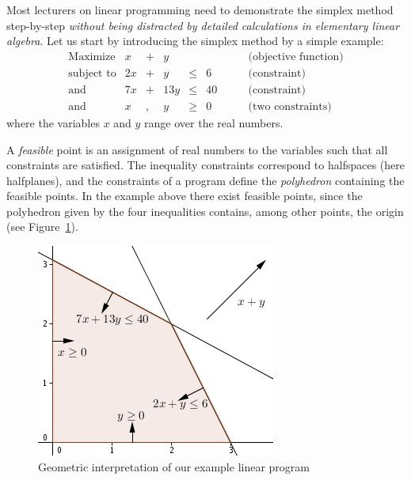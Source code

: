 \documentclass[ukenglish]{nik}
\begin{document}
Most lecturers on linear programming need to demonstrate the simplex method step-by-step 
\emph{without being distracted by detailed calculations in elementary linear algebra}. Let us start by
introducing the simplex method by a simple example:
\[
    \begin{array}{lrcrcrl}
			\text{Maximize}  &    x &+&    y &	&	& \quad\quad \text{(objective function)}\\
			\text{subject to}&  2 x &+&    y &\leq&   6	& \quad\quad \text{(constraint)}\\
    	\text{and}&         7 x &+& 13 y &\leq&  40 & \quad\quad \text{(constraint)}\\
    	\text{and}       &    x &,&    y &\geq&0    &\quad\quad \text{(two constraints)}
    \end{array}
\]
where the variables $x$ and $y$ range over the real numbers.

A \emph{feasible} point is an assignment of real numbers to the variables 
such that all constraints are satisfied. 
The inequality constraints correspond to halfspaces (here halfplanes), and the constraints of a program 
define the \emph{polyhedron} containing the feasible points.
In the example above there exist feasible points,
since the polyhedron given by the four inequalities contains,
among other points, the origin  (see Figure~\ref{fig:ex1}). 

\begin{figure}[htb]
	\begin{center}
		\includegraphics{ex1.jpg}
	\end{center}
	\caption{Geometric interpretation of our example linear program}
	\label{fig:ex1}
\end{figure}
\end{document}
